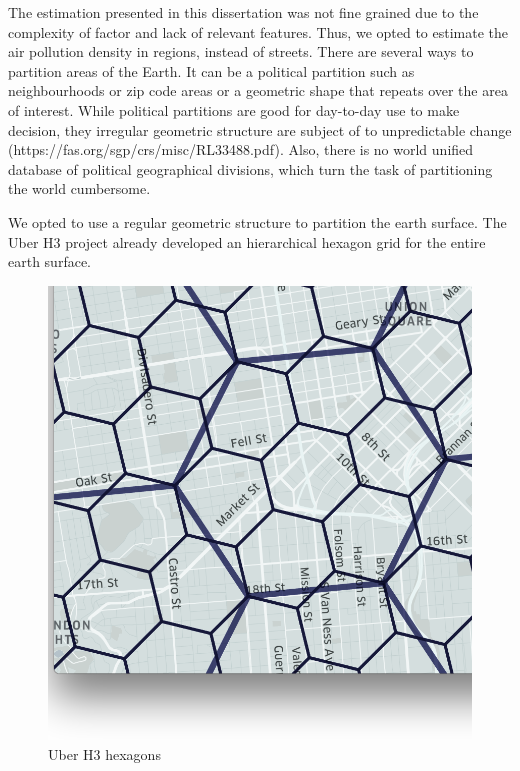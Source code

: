 The estimation presented in this dissertation was not fine grained due to the complexity of factor and lack of relevant features. Thus, we opted to estimate the air pollution density in regions, instead of streets. There are several ways to partition areas of the Earth. It can be a political partition such as neighbourhoods or zip code areas or a geometric shape that repeats over the area of interest. While political partitions are good for day-to-day use to make decision, they irregular geometric structure are subject of to unpredictable change (https://fas.org/sgp/crs/misc/RL33488.pdf). Also, there is no world unified database of political geographical divisions, which turn the task of partitioning the world cumbersome.

We opted to use a regular geometric structure to partition the earth surface. The Uber H3 project already developed an hierarchical hexagon grid for the entire earth surface. 

\begin{figure}[t]
    \centering
    \includegraphics[width=\textwidth]{figures/3-dados-metodologia/h3-hexagons.png}
    \caption{Uber H3 hexagons }
    \label{fig:3-pollution-map}
\end{figure}

